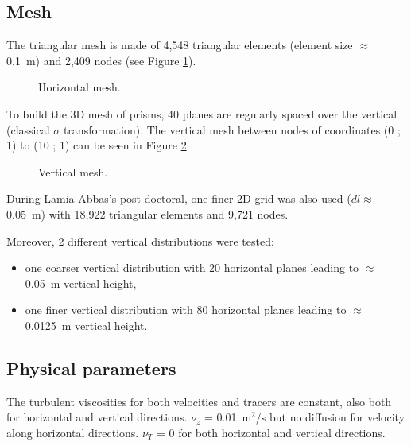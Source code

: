 \subsection{Mesh}
%
The triangular mesh is made of 4,548 triangular elements (element size
$\approx$ 0.1~m) and 2,409 nodes (see Figure \ref{fig:stratif_wind:mesh}).

\begin{figure}[H]
 \centering
  \caption{Horizontal mesh.}\label{fig:stratif_wind:mesh}
\end{figure}

To build the 3D mesh of prisms, 40 planes are regularly spaced over the vertical
(classical $\sigma$ transformation).
The vertical mesh between nodes of coordinates (0 ; 1) to (10 ; 1) can be seen
in Figure \ref{fig:stratif_wind:mesh:section}.

\begin{figure}[H]
 \centering
  \caption{Vertical mesh.}\label{fig:stratif_wind:mesh:section}
\end{figure}

During Lamia Abbas's post-doctoral, one finer 2D grid was also used
($dl \approx$ 0.05~m) with 18,922 triangular elements and 9,721 nodes.

Moreover, 2 different vertical distributions were tested:
\begin{itemize}
\item one coarser vertical distribution with 20 horizontal planes
  leading to $\approx$ 0.05~m vertical height,
\item one finer vertical distribution with 80 horizontal planes leading to
  $\approx$ 0.0125~m vertical height.
\end{itemize}

\subsection{Physical parameters}
%
The turbulent viscosities for both velocities and tracers are constant,
also both for horizontal and vertical directions.
$\nu_z$ = 0.01~m$^2$/s but no diffusion for velocity along horizontal directions.
$\nu_T$ = 0 for both horizontal and vertical directions.\\

